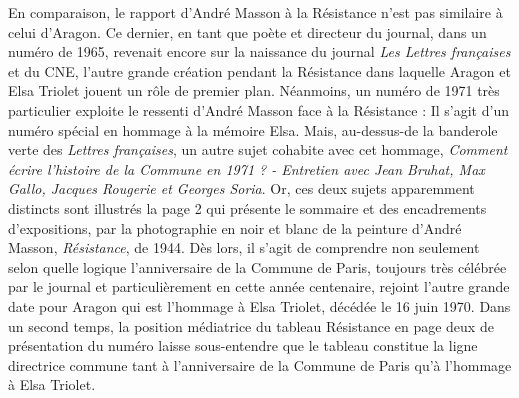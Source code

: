 En comparaison, le rapport d’André Masson à la Résistance n’est pas similaire à celui d’Aragon. Ce dernier, en tant que poète et  directeur du journal, dans un numéro de  1965,  revenait encore  sur la naissance du journal \emph{Les Lettres françaises} et du CNE, l’autre grande création pendant la Résistance dans laquelle Aragon et Elsa Triolet jouent un rôle de premier plan. Néanmoins, un numéro de 1971 très particulier exploite le ressenti d’André Masson face à la Résistance : Il s’agit d’un numéro spécial en hommage à la mémoire Elsa. Mais, au-dessus-de la banderole verte des \emph{Lettres françaises}, un autre sujet cohabite avec cet hommage, \emph{Comment écrire l’histoire de la Commune en 1971 ? - Entretien avec Jean Bruhat, Max Gallo, Jacques Rougerie et Georges Soria}. Or, ces deux sujets apparemment distincts sont illustrés la page 2 qui présente le sommaire et des encadrements d’expositions, par la photographie en noir et blanc de la peinture d’André Masson, \emph{Résistance}, de 1944. Dès lors, il s’agit de comprendre non seulement selon quelle logique l’anniversaire de la Commune de Paris, toujours très célébrée par le journal et particulièrement en cette année centenaire, rejoint l’autre grande date pour Aragon qui est l’hommage à Elsa Triolet, décédée le 16 juin 1970. Dans un second temps, la position médiatrice du tableau Résistance en page deux de présentation du numéro laisse sous-entendre que le tableau constitue la ligne directrice commune tant à l’anniversaire de la Commune de Paris qu’à l’hommage à Elsa Triolet. 



